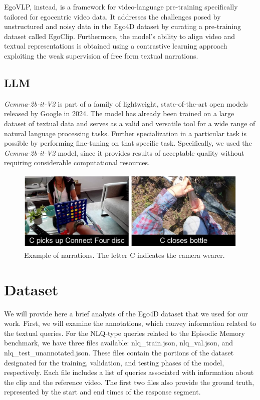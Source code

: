 \documentclass[10pt,twocolumn,letterpaper]{article}
\begin{document}
EgoVLP, instead, is a framework for video-language pre-training specifically tailored for egocentric video 
data. It addresses the challenges posed by unstructured and noisy data in the Ego4D dataset by curating a
pre-training dataset called EgoClip. Furthermore, the model’s ability to align video and textual representations is obtained using a contrastive learning approach exploiting the weak supervision of free
form textual narrations.

\subsection{LLM}
\textit{Gemma-2b-it-V2} \cite{gemmateam2024gemma} is part of a family of lightweight, state-of-the-art open models released by Google in 2024. The model has already been trained on a large dataset of textual data and serves as a valid and versatile tool for a wide range of natural language processing tasks. Further specialization in a particular task is possible by performing fine-tuning on that specific task.
Specifically, we used the \textit{Gemma-2b-it-V2} model, since it provides results of acceptable quality without requiring considerable computational resources.

\begin{figure}[h]
   \centering
   \includegraphics[width=1\linewidth]{images/2_images_with_narrations.png}
   \caption{Example of narrations. The letter C indicates the camera wearer.}
   \label{fig:nlq_task}
\end{figure}


\section{Dataset}
We will provide here a brief analysis of the Ego4D dataset that we used for our work. First, we will examine the annotations, which convey information related to the textual queries. For the NLQ-type queries related to the Episodic Memory benchmark, we have three files available: nlq\_train.json, nlq\_val.json, and nlq\_test\_unannotated.json. These files contain the portions of the dataset designated for the training, validation, and testing phases of the model, respectively. Each file includes a list of queries associated with information about the clip and the reference video. The first two files also provide the ground truth, represented by the start and end times of the response segment.
\end{document}
